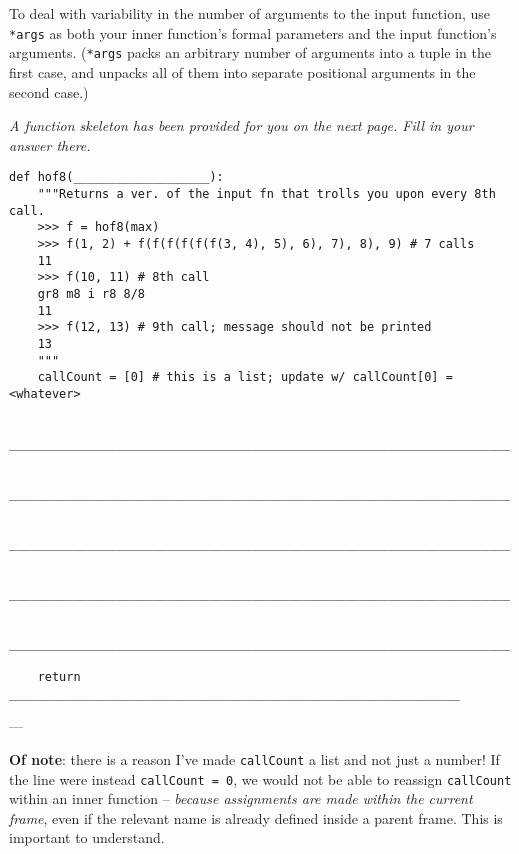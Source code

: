 \documentclass[twoside]{article}
\begin{document}
\begin{enumerate}
To deal with variability in the number of arguments to the input function, use \texttt{*args} as both your inner function's formal parameters and the input function's arguments. (\texttt{*args} packs an arbitrary number of arguments into a tuple in the first case, and unpacks all of them into separate positional arguments in the second case.)

\textit{A function skeleton has been provided for you on the next page. Fill in your answer there.}

\newpage

\begin{lstlisting}
def hof8(___________________):
    """Returns a ver. of the input fn that trolls you upon every 8th call.
    >>> f = hof8(max)
    >>> f(1, 2) + f(f(f(f(f(f(3, 4), 5), 6), 7), 8), 9) # 7 calls
    11
    >>> f(10, 11) # 8th call
    gr8 m8 i r8 8/8
    11
    >>> f(12, 13) # 9th call; message should not be printed
    13
    """
    callCount = [0] # this is a list; update w/ callCount[0] = <whatever>
    
    ______________________________________________________________________

    ______________________________________________________________________

    ______________________________________________________________________

    ______________________________________________________________________
    
    ______________________________________________________________________
    
    return _______________________________________________________________
\end{lstlisting}

---

\textbf{Of note}: there is a reason I've made \texttt{callCount} a list and not just a number! If the line were instead \texttt{callCount = 0}, we would not be able to reassign \texttt{callCount} within an inner function -- \textit{because assignments are made within the current frame}, even if the relevant name is already defined inside a parent frame. This is important to understand.

\end{enumerate}
\end{document}
